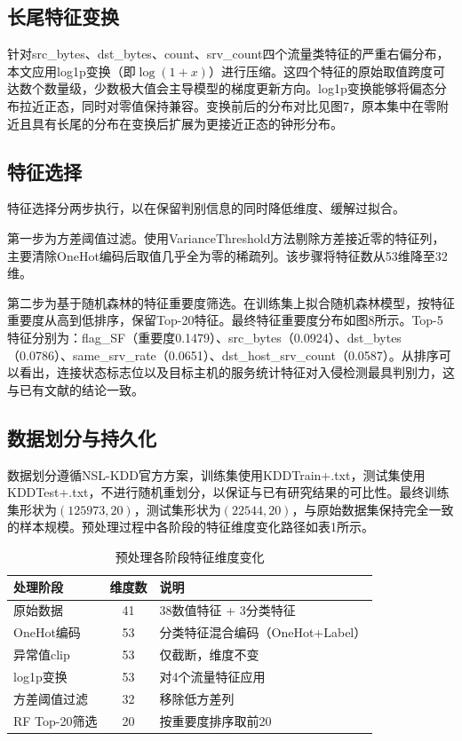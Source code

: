 \subsection{长尾特征变换}

针对src\_bytes、dst\_bytes、count、srv\_count四个流量类特征的严重右偏分布，本文应用log1p变换（即$\log(1+x)$）进行压缩。这四个特征的原始取值跨度可达数个数量级，少数极大值会主导模型的梯度更新方向。log1p变换能够将偏态分布拉近正态，同时对零值保持兼容。变换前后的分布对比见图7，原本集中在零附近且具有长尾的分布在变换后扩展为更接近正态的钟形分布。

\subsection{特征选择}

特征选择分两步执行，以在保留判别信息的同时降低维度、缓解过拟合。

第一步为方差阈值过滤。使用VarianceThreshold方法剔除方差接近零的特征列，主要清除OneHot编码后取值几乎全为零的稀疏列。该步骤将特征数从53维降至32维。

第二步为基于随机森林的特征重要度筛选。在训练集上拟合随机森林模型，按特征重要度从高到低排序，保留Top-20特征。最终特征重要度分布如图8所示。Top-5特征分别为：flag\_SF（重要度0.1479）、src\_bytes（0.0924）、dst\_bytes（0.0786）、same\_srv\_rate（0.0651）、dst\_host\_srv\_count（0.0587）。从排序可以看出，连接状态标志位以及目标主机的服务统计特征对入侵检测最具判别力，这与已有文献的结论一致。

\subsection{数据划分与持久化}

数据划分遵循NSL-KDD官方方案，训练集使用KDDTrain+.txt，测试集使用KDDTest+.txt，不进行随机重划分，以保证与已有研究结果的可比性。最终训练集形状为$(125973, 20)$，测试集形状为$(22544, 20)$，与原始数据集保持完全一致的样本规模。预处理过程中各阶段的特征维度变化路径如表1所示。

\begin{table}[htbp]
\centering
\caption{预处理各阶段特征维度变化}
\label{tab:dim-path}
\begin{tabular}{lcl}
\toprule
处理阶段 & 维度数 & 说明 \\
\midrule
原始数据 & 41 & 38数值特征 + 3分类特征 \\
OneHot编码 & 53 & 分类特征混合编码（OneHot+Label） \\
异常值clip & 53 & 仅截断，维度不变 \\
log1p变换 & 53 & 对4个流量特征应用 \\
方差阈值过滤 & 32 & 移除低方差列 \\
RF Top-20筛选 & 20 & 按重要度排序取前20 \\
\bottomrule
\end{tabular}
\end{table}


